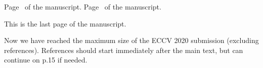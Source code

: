 \documentclass[runningheads]{llncs}
\begin{document}
\clearpage\mbox{}Page \thepage\ of the manuscript.
\clearpage\mbox{}Page \thepage\ of the manuscript.

This is the last page of the manuscript.
\par\vfill\par
Now we have reached the maximum size of the ECCV 2020 submission (excluding references).
References should start immediately after the main text, but can continue on p.15 if needed.

\clearpage
%
%


\end{document}
